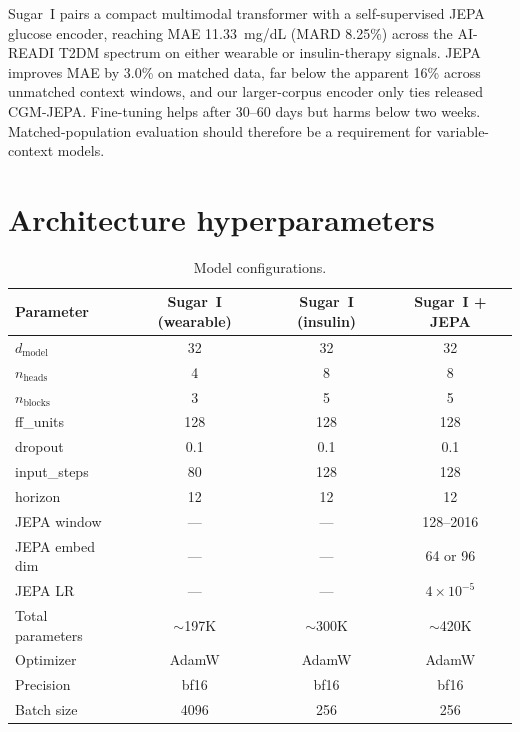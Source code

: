 \documentclass[11pt,a4paper]{article}
\begin{document}
Sugar~I pairs a compact multimodal transformer with a self-supervised JEPA glucose encoder, reaching MAE 11.33~mg/dL (MARD 8.25\%) across the AI-READI T2DM spectrum on either wearable or insulin-therapy signals.
JEPA improves MAE by 3.0\% on matched data, far below the apparent 16\% across unmatched context windows, and our larger-corpus encoder only ties released CGM-JEPA.
Fine-tuning helps after 30--60 days but harms below two weeks.
Matched-population evaluation should therefore be a requirement for variable-context models.




\appendix
\section{Architecture hyperparameters}
\label{app:hparams}

\begin{table}[h]
\centering
\caption{Model configurations.}
\label{tab:hparams}
\begin{tabular}{lccc}
\toprule
\textbf{Parameter} & \textbf{Sugar~I (wearable)} & \textbf{Sugar~I (insulin)} & \textbf{Sugar~I + JEPA} \\
\midrule
$d_\text{model}$ & 32 & 32 & 32 \\
$n_\text{heads}$ & 4 & 8 & 8 \\
$n_\text{blocks}$ & 3 & 5 & 5 \\
ff\_units & 128 & 128 & 128 \\
dropout & 0.1 & 0.1 & 0.1 \\
input\_steps & 80 & 128 & 128 \\
horizon & 12 & 12 & 12 \\
JEPA window & --- & --- & 128--2016 \\
JEPA embed dim & --- & --- & 64 or 96 \\
JEPA LR & --- & --- & $4 \times 10^{-5}$ \\
Total parameters & $\sim$197K & $\sim$300K & $\sim$420K \\
Optimizer & AdamW & AdamW & AdamW \\
Precision & bf16 & bf16 & bf16 \\
Batch size & 4096 & 256 & 256 \\
\bottomrule
\end{tabular}
\end{table}
\end{document}
